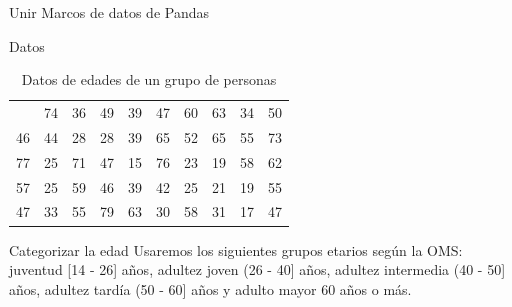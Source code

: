 \documentclass[
  ignorenonframetext,
  aspectratio=169,
  spanish,
]{beamer}
\begin{document}
\begin{frame}[fragile]{Unir Marcos de datos de Pandas}
\begin{block}{Datos}
\label{datos}
\begin{longtable}[]{@{}rrrrrrrrrr@{}}

\caption{\label{tbl-datosedades}Datos de edades de un grupo de personas}

\tabularnewline

\toprule\noalign{}
\endhead
\bottomrule\noalign{}
\endlastfoot
20 & 74 & 36 & 49 & 39 & 47 & 60 & 63 & 34 & 50 \\
46 & 44 & 28 & 28 & 39 & 65 & 52 & 65 & 55 & 73 \\
77 & 25 & 71 & 47 & 15 & 76 & 23 & 19 & 58 & 62 \\
57 & 25 & 59 & 46 & 39 & 42 & 25 & 21 & 19 & 55 \\
47 & 33 & 55 & 79 & 63 & 30 & 58 & 31 & 17 & 47 \\

\end{longtable}
\end{block}

\begin{block}{Categorizar la edad}
\label{categorizar-la-edad}
Usaremos los siguientes grupos etarios según la OMS: juventud {[}14 -
26{]} años, adultez joven (26 - 40{]} años, adultez intermedia (40 -
50{]} años, adultez tardía (50 - 60{]} años y adulto mayor 60 años o
más.


\end{block}
\end{frame}
\end{document}
